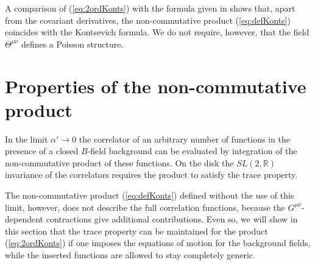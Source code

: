 \documentclass[a4paper,12pt]{article}
\newcommand {\bbR}{\mathbb{R}}
\begin{document}
A comparison of (\ref{eq:2ordKonts}) with the formula given in
\cite{Kontsevich:1997vb}
shows that, apart from the covariant derivatives, the non-commutative
product (\ref{eq:defKonts}) coincides with the Kontsevich formula.
We do not require, however, that the field $\Theta^{\mu\nu}$ defines
a Poisson structure. 

\section{Properties of the non-commutative product}
\label{sec:properties}

In the limit $\alpha' \!\rightarrow\! 0$ the correlator of an arbitrary
number of functions in the presence of a closed $B$-field background can 
be evaluated by integration of the non-commutative product of these 
functions. On the disk the $SL(2,\bbR)$ invariance of the correlators 
requires the product to satisfy the trace property.

The non-commutative product (\ref{eq:defKonts}) defined without
the use of this limit, however, 
does not describe the full correlation functions,
because the $G^{\mu\nu}$-dependent contractions give additional contributions. 
Even so, we will show in this section that the trace property can be 
maintained for the product (\ref{eq:2ordKonts}) if one imposes the 
equations of motion for the background fields, while the inserted 
functions are allowed to stay completely generic.
\end{document}

